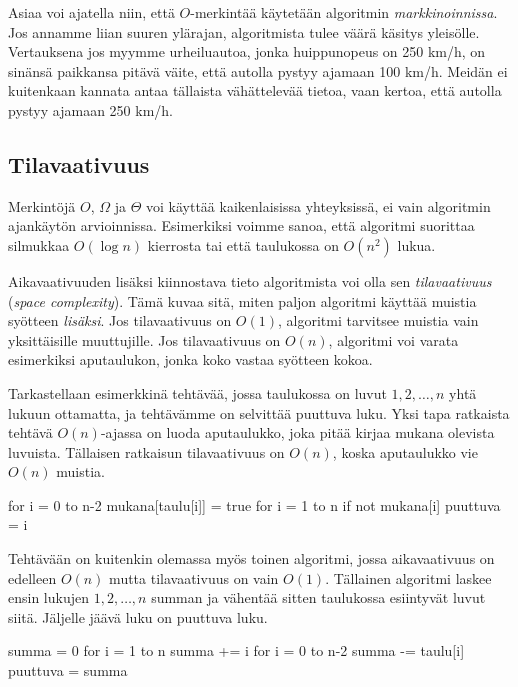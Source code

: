 Asiaa voi ajatella niin, että $O$-merkintää käytetään algoritmin
\emph{markkinoinnissa}. Jos annamme liian suuren ylärajan, algoritmista
tulee väärä käsitys yleisölle.
Vertauksena jos myymme urheiluautoa, jonka huippunopeus on 250 km/h,
on sinänsä paikkansa pitävä väite, että autolla pystyy ajamaan 100 km/h.
Meidän ei kuitenkaan kannata antaa tällaista vähättelevää tietoa,
vaan kertoa, että autolla pystyy ajamaan 250 km/h.

\subsection{Tilavaativuus}


Merkintöjä $O$, $\Omega$ ja $\Theta$ voi käyttää
kaikenlaisissa yhteyksissä, ei vain algoritmin ajankäytön arvioinnissa.
Esimerkiksi voimme sanoa, että algoritmi suorittaa silmukkaa $O(\log n)$ kierrosta
tai että taulukossa on $O(n^2)$ lukua.

Aikavaativuuden lisäksi kiinnostava tieto algoritmista voi olla sen
\emph{tilavaativuus} (\emph{space complexity}). Tämä kuvaa sitä, miten paljon algoritmi
käyttää muistia syötteen \emph{lisäksi}.
Jos tilavaativuus on $O(1)$, algoritmi tarvitsee muistia
vain yksittäisille muuttujille.
Jos tilavaativuus on $O(n)$, algoritmi voi varata esimerkiksi aputaulukon,
jonka koko vastaa syötteen kokoa.

Tarkastellaan esimerkkinä tehtävää, jossa taulukossa on
luvut $1,2,\dots,n$ yhtä lukuun ottamatta,
ja tehtävämme on selvittää puuttuva luku.
Yksi tapa ratkaista tehtävä $O(n)$-ajassa on luoda aputaulukko,
joka pitää kirjaa mukana olevista luvuista.
Tällaisen ratkaisun tilavaativuus on $O(n)$,
koska aputaulukko vie $O(n)$ muistia.

\begin{code}
for i = 0 to n-2
    mukana[taulu[i]] = true
for i = 1 to n
    if not mukana[i]
        puuttuva = i
\end{code}

Tehtävään on kuitenkin olemassa myös toinen algoritmi,
jossa aikavaativuus on edelleen $O(n)$ mutta tilavaativuus on vain $O(1)$.
Tällainen algoritmi laskee ensin lukujen $1,2,\dots,n$ summan
ja vähentää sitten taulukossa esiintyvät luvut siitä.
Jäljelle jäävä luku on puuttuva luku.

\begin{code}
summa = 0
for i = 1 to n
    summa += i
for i = 0 to n-2
    summa -= taulu[i]
puuttuva = summa
\end{code}

